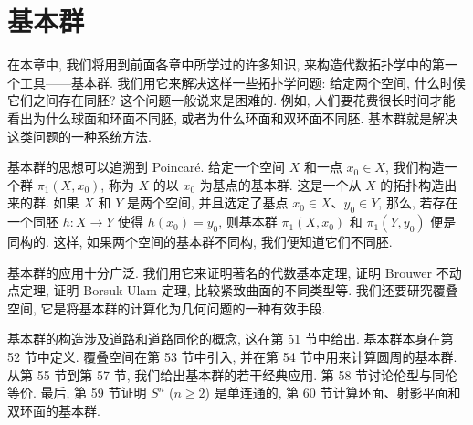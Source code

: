 ﻿\chapter{基本群}
\label{chapter:ch09}

在本章中, 我们将用到前面各章中所学过的许多知识, 来构造代数拓扑学中的第一个工具——基本群. 我们用它来解决这样一些拓扑学问题: 给定两个空间, 什么时候它们之间存在同胚? 这个问题一般说来是困难的. 例如, 人们要花费很长时间才能看出为什么球面和环面不同胚, 或者为什么环面和双环面不同胚. 基本群就是解决这类问题的一种系统方法.

基本群的思想可以追溯到 Poincaré. 给定一个空间 $X$ 和一点 $x_0\in X$, 我们构造一个群 $\pi_1(X,x_0)$, 称为 $X$ 的以 $x_0$ 为基点的基本群. 这是一个从 $X$ 的拓扑构造出来的群. 如果 $X$ 和 $Y$ 是两个空间, 并且选定了基点 $x_0\in X$、$y_0\in Y$, 那么, 若存在一个同胚 $h\colon X\to Y$ 使得 $h(x_0)=y_0$, 则基本群 $\pi_1(X,x_0)$ 和 $\pi_1(Y,y_0)$ 便是同构的. 这样, 如果两个空间的基本群不同构, 我们便知道它们不同胚.

基本群的应用十分广泛. 我们用它来证明著名的代数基本定理, 证明 Brouwer 不动点定理, 证明 Borsuk-Ulam 定理, 比较紧致曲面的不同类型等. 我们还要研究覆叠空间, 它是将基本群的计算化为几何问题的一种有效手段.

基本群的构造涉及道路和道路同伦的概念, 这在第 51 节中给出. 基本群本身在第 52 节中定义. 覆叠空间在第 53 节中引入, 并在第 54 节中用来计算圆周的基本群. 从第 55 节到第 57 节, 我们给出基本群的若干经典应用. 第 58 节讨论伦型与同伦等价. 最后, 第 59 节证明 $S^n$ ($n\geqslant 2$) 是单连通的, 第 60 节计算环面、射影平面和双环面的基本群.











